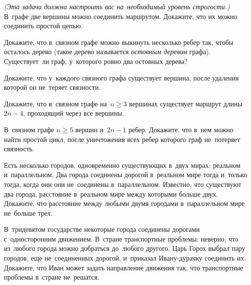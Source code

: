 \begin{problems}

\item
\emph{(Эта задача должна настроить вас на~необходимый уровень строгости.)}
В~графе две вершины можно соединить маршрутом.
Докажите, что их можно соединить простой цепью.



\item
\subproblem
Докажите, что в~связном графе можно выкинуть несколько ребер так, чтобы
осталось дерево (такое дерево называется \emph{остовным деревом} графа).
\\
\subproblem
Существует~ли граф, у~которого ровно два остовных дерева?

\item
Докажите, что у~каждого связного графа существует вершина, после удаления
которой он не~теряет связности.

\item
Докажите, что в~связном графе на~$n \geq 3$ вершинах существует маршрут длины
$2 n - 4$, проходящий через все вершины.

\item
В~связном графе $n \geq 5$ вершин и~$2 n - 1$ ребер.
Докажите, что в~нем можно найти простой цикл, после уничтожения всех ребер
которого граф не~потеряет связность.

\item
Есть несколько городов, одновременно существующих в~двух мирах: реальном
и~параллельном.
Два города соединены дорогой в~реальном мире тогда и~только тогда, когда они
они не~соединены в~параллельном.
Известно, что существуют два города, расстояние в~реальном мире между которыми
больше двух.
Докажите, что расстояние между любыми двумя городами в~параллельном мире
не~больше трех.


\item
В~тридевятом государстве некоторые города соединены дорогами с~односторонним
движением.
В~стране транспортные проблемы: неверно, что из~любого города можно добраться
до~любого другого.
Царь Горох выбрал пару городов, еще не~соединенных дорогой, и~приказал
Ивану-дурачку соединить их.
Докажите, что Иван может задать направление движения так, что транспортные
проблемы в~стране не~решатся.


\end{problems}
